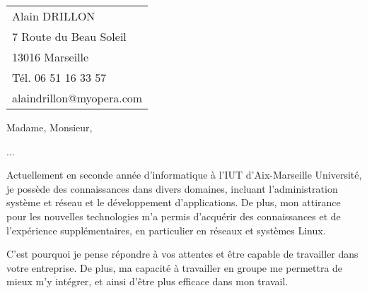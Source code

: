 \documentclass[11pt]{article}
\begin{document}
    \begin{tabular}{l}
        Alain DRILLON \\
        7 Route du Beau Soleil\\
        13016 Marseille\\
        Tél. 06 51 16 33 57\\
        alaindrillon@myopera.com
    \end{tabular}

    \vspace{2cm}

    Madame, Monsieur,
    \vspace{0.75cm}

    ...

    \vspace{0.75cm}
    Actuellement en seconde année d'informatique à l'IUT d'Aix-Marseille Université, je possède des connaissances dans divers domaines, incluant l'administration système et réseau et le développement d'applications.
    De plus, mon attirance pour les nouvelles technologies m'a permis d’acquérir des connaissances et de l'expérience supplémentaires, en particulier en réseaux et systèmes Linux.
   
   C'est pourquoi je pense répondre à vos attentes et être capable de travailler dans votre entreprise. De plus, ma capacité à travailler en groupe me permettra de mieux m'y intégrer, et ainsi d'être plus efficace dans mon travail.
\end{document}
